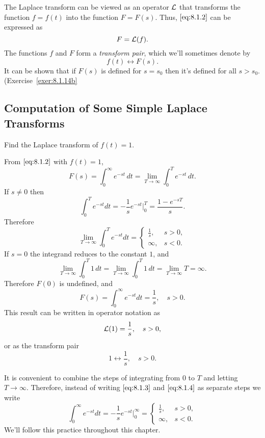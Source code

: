 \documentclass{ximera}
\begin{document}
The Laplace transform can be viewed as an operator ${\cal L}$ that
transforms the function $f=f(t)$  into the function $F=F(s)$. Thus,
$\eqref{eq:8.1.2}$ can be expressed as
$$
F={\cal L}(f).
$$
The functions $f$ and $F$ form a \textit{transform pair}, which we'll
sometimes denote by
$$
f(t)\leftrightarrow F(s).
$$
It can be shown that if $F(s)$ is defined for $s=s_0$ then it's defined
for all $s>s_0$. (Exercise~\ref{exer:8.1.14b}

\subsection*{Computation of Some Simple Laplace Transforms}

\begin{example}\label{example:8.1.1} 
 Find the Laplace transform of  $f(t)=1$.


\begin{explanation}
 From $\eqref{eq:8.1.2}$ with $f(t)=1$,
$$
F(s)=\int_0^\infty e^{-st}\,dt=\lim_{T\rightarrow\infty}\int_0^T e^{-st}\,
dt.
$$
If $s\neq 0$ then
\begin{equation}\label{eq:8.1.3}
\int_0^T e^{-st}dt=-\frac{1}{s}e^{-st}\Big|_0^T=\frac{1-e^{-sT}}{s}.
\end{equation}
Therefore
\begin{equation}\label{eq:8.1.4}
\lim_{T\rightarrow\infty}\int_0^T e^{-st}dt=\left\{\begin{array}{rr}
\frac{1}{s}, &   s>0,\\
\infty, &  s<0.
\end{array}\right.
\end{equation}
If $s=0$  the integrand reduces to the constant $1$, and
$$
\lim_{T\rightarrow\infty}\int_0^T 1\,dt=\lim_{T\rightarrow\infty}\int_0^T 1\,dt=
\lim_{T\rightarrow\infty}T=\infty.
$$
Therefore $F(0)$ is undefined, and
$$
F(s)=\int_0^\infty e^{-st}dt=\frac{1}{s},\quad s>0.
$$
This result can be written in operator notation as
$$
{\cal L}(1)=\frac{1}{s},\quad s>0,
$$
or as the transform pair
$$
1\leftrightarrow\frac{1}{s},\quad s>0.
$$
\end{explanation}
\end{example}
\begin{remark}
It is convenient to combine the steps of integrating from $0$ to $T$
and letting $T\rightarrow\infty$. Therefore, instead of writing $\eqref{eq:8.1.3}$
and $\eqref{eq:8.1.4}$ as separate steps we write
$$
\int_0^\infty e^{-st}dt=-\frac{1}{s} e^{-st}\Big|_0^\infty=
\left\{\begin{array}{rr}\frac{1}{s}, & s>0,\\\infty,&s<
0.\end{array}\right.
$$
We'll follow this practice throughout this chapter.
\end{remark}
\end{document}
